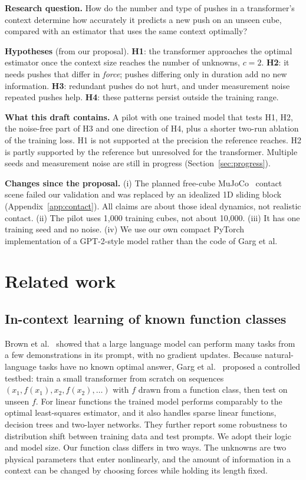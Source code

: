 \documentclass{article}
\begin{document}
\textbf{Research question.} How do the number and type of pushes in a transformer's context determine how accurately it predicts a new push on an unseen cube, compared with an estimator that uses the same context optimally?

\textbf{Hypotheses} (from our proposal). \textbf{H1}: the transformer approaches the optimal estimator once the context size reaches the number of unknowns, $c=2$. \textbf{H2}: it needs pushes that differ in \emph{force}; pushes differing only in duration add no new information. \textbf{H3}: redundant pushes do not hurt, and under measurement noise repeated pushes help. \textbf{H4}: these patterns persist outside the training range.

\textbf{What this draft contains.} A pilot with one trained model that tests H1, H2, the noise-free part of H3 and one direction of H4, plus a shorter two-run ablation of the training loss. H1 is not supported at the precision the reference reaches. H2 is partly supported by the reference but unresolved for the transformer. Multiple seeds and measurement noise are still in progress (Section~\ref{sec:progress}).

\textbf{Changes since the proposal.} (i) The planned free-cube MuJoCo~\cite{todorov2012} contact scene failed our validation and was replaced by an idealized 1D sliding block (Appendix~\ref{app:contact}). All claims are about those ideal dynamics, not realistic contact. (ii) The pilot uses 1,000 training cubes, not about 10,000. (iii) It has one training seed and no noise. (iv) We use our own compact PyTorch implementation of a GPT-2-style model rather than the code of Garg et al.

\section{Related work}
\subsection{In-context learning of known function classes}
Brown et al.~\cite{brown2020} showed that a large language model can perform many tasks from a few demonstrations in its prompt, with no gradient updates. Because natural-language tasks have no known optimal answer, Garg et al.~\cite{garg2022} proposed a controlled testbed: train a small transformer from scratch on sequences $(x_1,f(x_1),x_2,f(x_2),\dots)$ with $f$ drawn from a function class, then test on unseen $f$. For linear functions the trained model performs comparably to the optimal least-squares estimator, and it also handles sparse linear functions, decision trees and two-layer networks. They further report some robustness to distribution shift between training data and test prompts. We adopt their logic and model size. Our function class differs in two ways. The unknowns are two physical parameters that enter nonlinearly, and the amount of information in a context can be changed by choosing forces while holding its length fixed.
\end{document}
